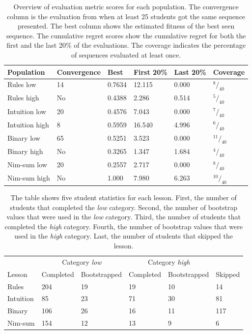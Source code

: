 \begin{table}
	\centering
	\caption[Evaluation metric scores of each population]{Overview of
	evaluation metric scores for each population. The convergence column is the
evaluation from when at least 25 students got the same sequence presented. The
best column shows the estimated fitness of the best seen sequence. The
cumulative regret scores show the cumulative regret for both the first and the
last 20\% of the evaluations. The coverage indicates the percentage of
sequences evaluated at least once.}
	\label{tab:pop_metrics}
	\begin{tabular}{llllll}\hline
		\textbf{Population} & \textbf{Convergence} & \textbf{Best} &
		\textbf{First 20\%} & \textbf{Last 20\%} & \textbf{Coverage} \\\hline
		Rules low & 14 & 0.7634  & 12.115 & 0.000 & $^{8}/_{40}$ \\
		Rules high & No & 0.4388 & 2.286 & 0.514 & $^{5}/_{40}$ \\
		Intuition low & 20 & 0.4576 & 7.043 & 0.000 & $^{7}/_{40}$ \\
		Intuition high & 8 & 0.5959 & 16.540 & 4.996 & $^{6}/_{40}$ \\
		Binary low & 65 & 0.5251 & 3.523 & 0.000 & $^{11}/_{40}$ \\
		Binary high & No & 0.3265 & 1.347 & 1.684 & $^{4}/_{40}$ \\
		Nim-sum low & 20 & 0.2557 & 2.717 & 0.000 & $^{8}/_{40}$ \\
		Nim-sum high & No & 1.000 & 7.980 & 6.263 & $^{10}/_{40}$ \\
	\end{tabular}
\end{table}

\begin{table}
	\centering
	\caption[Student statistics of each lesson]{The table shows five student statistics for each lesson.
	First, the number of students that completed the \emph{low} category.
	Second, the number of bootstrap values that were used in the
	\emph{low} category. Third, the number of students that completed the
	\emph{high} category. Fourth, the number of bootstrap values that were used in
	the \emph{high} category. Last, the number of students that skipped the
	lesson.}
	\label{tab:exp_stats_students}
	\begin{tabular}{l|lllll}\hline
		\multicolumn{1}{l}{}& \multicolumn{2}{c}{Category \emph{low}} & \multicolumn{2}{c}{Category
			\emph{high}} & \\
		\multicolumn{1}{l}{Lesson} & Completed & Bootstrapped & Completed & Bootstrapped & Skipped\\
		\hline
		Rules & 204 & 19 & 19 & 10 & 14 \\
		Intuition & 85 &  23 & 71 & 30 & 81 \\
		Binary & 106 & 26 & 16 & 11 & 117 \\
		Nim-sum & 154 & 12 & 13 & 9 & 6 \\
	\end{tabular}
\end{table}

